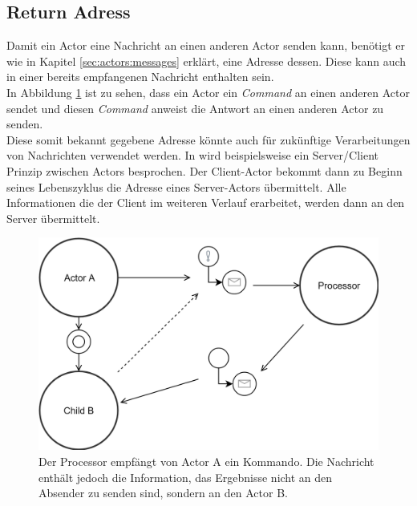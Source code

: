 
\subsection{Return Adress}
Damit ein Actor eine Nachricht an einen anderen Actor senden kann, benötigt er wie in Kapitel \ref{sec:actors:messages} erklärt, eine Adresse dessen. Diese kann auch in einer bereits empfangenen Nachricht enthalten sein. \\
In Abbildung \ref{fig:actor:patterns:returnAdress} ist zu sehen, dass ein Actor ein \textit{Command} an einen anderen Actor sendet und diesen \textit{Command} anweist die Antwort an einen anderen Actor zu senden. \\
Diese somit bekannt gegebene Adresse könnte auch für zukünftige Verarbeitungen von Nachrichten verwendet werden. In \cite{Vernon2015ReactiveAkka} wird beispielsweise ein Server/Client Prinzip zwischen Actors besprochen. Der Client-Actor bekommt dann zu Beginn seines Lebenszyklus die Adresse eines Server-Actors übermittelt. Alle Informationen die der Client im weiteren Verlauf erarbeitet, werden dann an den Server übermittelt.

\begin{figure}
    \centering
    \includegraphics[width=\linewidth]{gfx/actor/patterns/returnAddress}
    \caption{Der Processor empfängt von Actor A ein Kommando. Die Nachricht enthält jedoch die Information, das Ergebnisse nicht an den Absender zu senden sind, sondern an den Actor B.}
    \label{fig:actor:patterns:returnAdress}
\end{figure}


